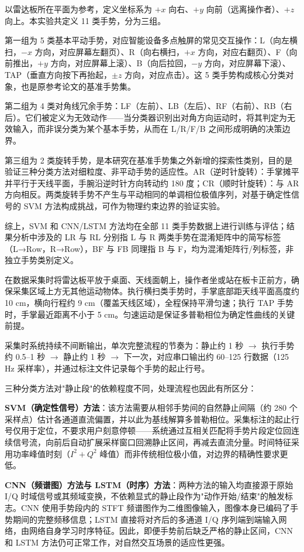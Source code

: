以雷达板所在平面为参考，定义坐标系为 $+x$ 向右、$+y$ 向前（远离操作者）、$+z$ 向上。本实验共定义 11 类手势，分为三组。

第一组为 5 类基本平动手势，对应智能设备多点触屏的常见交互操作：L（向左横扫，$-x$ 方向，对应屏幕左翻页）、R（向右横扫，$+x$ 方向，对应右翻页）、F（向前推出，$+y$ 方向，对应屏幕上滚）、B（向后拉回，$-y$ 方向，对应屏幕下滚）、TAP（垂直方向按下再抬起，$\pm z$ 方向，对应点击）。这 5 类手势构成核心分类对象，也是原参考论文的基准手势集。

第二组为 4 类对角线冗余手势：LF（左前）、LB（左后）、RF（右前）、RB（右后）。它们被定义为无效动作——当分类器识别出对角方向运动时，将其判定为无效输入，而非误分类为某个基本手势，从而在 L/R/F/B 之间形成明确的决策边界。

第三组为 2 类旋转手势，是本研究在基准手势集之外新增的探索性类别，目的是验证三种分类方法对细粒度、非平动手势的适应性。AR（逆时针旋转）：手掌摊平并平行于天线平面，手腕沿逆时针方向转动约 180 度；CR（顺时针旋转）：与 AR 方向相反。两类旋转手势不产生与平动相同的单调相位极值序列，对基于确定性信号的 SVM 方法构成挑战，可作为物理约束边界的验证实验。

综上，SVM 和 CNN/LSTM 方法均在全部 11 类手势数据上进行训练与评估；结果分析中涉及的 LR 与 RL 分别指 L 与 R 两类手势在混淆矩阵中的简写标签（L→Row，R→Row），BF 与 FB 同理指 B 与 F，均为混淆矩阵行/列标签，非独立手势类别定义。

在数据采集时将雷达板平放于桌面、天线面朝上，操作者坐或站在板卡正前方，确保采集区域上方无其他运动物体。执行横扫类手势时，手掌底部距天线平面高度约 10 cm，横向行程约 9 cm（覆盖天线区域），全程保持平滑匀速；执行 TAP 手势时，手掌最近距离不小于 5 cm。匀速运动是保证多普勒相位为确定性曲线的关键前提。

采集时系统持续不间断输出，单次完整流程的节奏为：静止约 1 秒 $\rightarrow$ 执行手势约 0.5--1 秒 $\rightarrow$ 静止约 1 秒 $\rightarrow$ 下一次，对应串口输出约 60--125 行数据（125 Hz 采样率），并通过标注文件记录每个手势的起止行号。

三种分类方法对"静止段"的依赖程度不同，处理流程也因此有所区分：

\textbf{SVM（确定性信号）方法}：该方法需要从相邻手势间的自然静止间隔（约 280 个采样点）估计各通道直流偏置，并以此为基线解算多普勒相位。采集标注的起止行号仅用于定位，不要求用户刻意停顿——系统通过互相关匹配将手势片段定位回连续信号流，向前后自动扩展采样窗口回溯静止区间，再减去直流分量。时间特征采用功率峰值时刻（$I^2 + Q^2$ 峰值）而非传统相位极小值，对边界的精确性要求更低。

\textbf{CNN（频谱图）方法与 LSTM（时序）方法}：两种方法的输入均直接源于原始 I/Q 时域信号或其频域变换，不依赖显式的静止段作为"动作开始/结束"的触发标志。CNN 使用手势段内的 STFT 频谱图作为二维图像输入，图像本身已编码了手势期间的完整频移信息；LSTM 直接将对齐后的多通道 I/Q 序列端到端输入网络，由网络自身学习时序特征。因此，即便手势前后缺乏严格的静止区间，CNN 和 LSTM 方法仍可正常工作，对自然交互场景的适应性更强。

